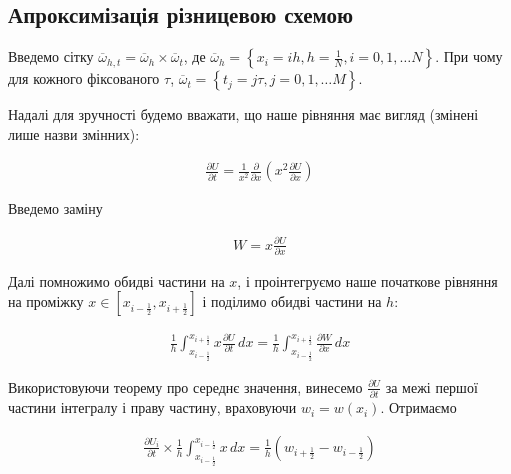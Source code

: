 \subsection{Апроксимізація різницевою схемою}

Введемо сітку \( \overline{\omega}_{h,t} = \overline{\omega}_h \times \overline{\omega}_t\), де \( \overline{\omega}_h = \left\{ x_i = ih, h = \frac{1}{N}, i = 0, 1, \dots N\right\}\). При чому для кожного фіксованого \( \tau\), \( \overline{\omega}_t = \left\{t_j = j\tau, j = 0, 1, \dots M\right\}\). 
\bigskip

Надалі для зручності будемо вважати, що наше рівняння має вигляд (змінені лише назви змінних):

\begin{equation}
\begin{multlined} \label{simplified}
\frac{\partial U}{\partial t} = \frac{1}{x^2} \frac{\partial}{\partial x} \left( x^2 \frac{\partial U}{\partial x}\right)
\end{multlined}
\end{equation}

Введемо заміну

\begin{equation}
\begin{multlined} \label{simplified}
W = x \frac{\partial U}{\partial x}
\end{multlined}
\end{equation}

Далі помножимо обидві частини на \( x\), і проінтегруємо наше початкове рівняння на проміжку \(x \in [x_{i-\frac{1}{2}}, x_{i+\frac{1}{2}}]\) і поділимо обидві частини на \( h\):

\begin{equation}
\begin{multlined} \label{simplified}
\frac{1}{h} \int_{x_{i - \frac{1}{2}}}^{x_{i+\frac{1}{2}}} {x\frac{\partial U}{\partial t}}\,dx = \frac{1}{h} \int_{x_{i - \frac{1}{2}}}^{x_{i+\frac{1}{2}}} {\frac{\partial W}{\partial x}}\,dx
\end{multlined}
\end{equation}

Використовуючи теорему про середнє значення, винесемо \( \frac{\partial U}{\partial t}\) за межі першої частини інтегралу і праву частину, враховуючи \( w_i = w(x_i)\). Отримаємо

\begin{equation}
\begin{multlined} \label{simplified}
\frac{\partial U_i}{\partial t} \times \frac{1}{h} \int_{x_{i-\frac{1}{2}}}^{x_{i-\frac{1}{2}}} {x}\,dx = \frac{1}{h}\left( w_{i + \frac{1}{2}} - w_{i - \frac{1}{2}}\right)
\end{multlined}
\end{equation}


